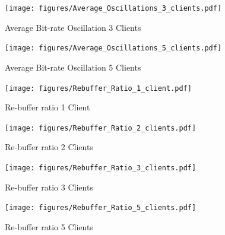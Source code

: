 \documentclass[10pt,sigconf]{acmart}
\begin{document}
\begin{figure}
  \centering
  \texttt{[image: figures/Average\_Oscillations\_3\_clients.pdf]}
  \caption{Average Bit-rate Oscillation 3 Clients}
  \label{fig:avg-oscillation-clients-3}
\end{figure}

\begin{figure}
  \centering
  \texttt{[image: figures/Average\_Oscillations\_5\_clients.pdf]}
  \caption{Average Bit-rate Oscillation 5 Clients}
  \label{fig:avg-oscillation-clients-5}
\end{figure}

\begin{figure}
  \centering
  \texttt{[image: figures/Rebuffer\_Ratio\_1\_client.pdf]}
  \caption{Re-buffer ratio 1 Client}
  \label{fig:rebuffer-ratio-clients-1}
\end{figure}

\begin{figure}
  \centering
  \texttt{[image: figures/Rebuffer\_Ratio\_2\_clients.pdf]}
  \caption{Re-buffer ratio 2 Clients}
  \label{fig:rebuffer-ratio-clients-2}
\end{figure}

\begin{figure}
  \centering
  \texttt{[image: figures/Rebuffer\_Ratio\_3\_clients.pdf]}
  \caption{Re-buffer ratio 3 Clients}
  \label{fig:rebuffer-ratio-clients-3}
\end{figure}

\begin{figure}
  \centering
  \texttt{[image: figures/Rebuffer\_Ratio\_5\_clients.pdf]}
  \caption{Re-buffer ratio 5 Clients}
  \label{fig:rebuffer-ratio-clients-5}
\end{figure}


\end{document}
